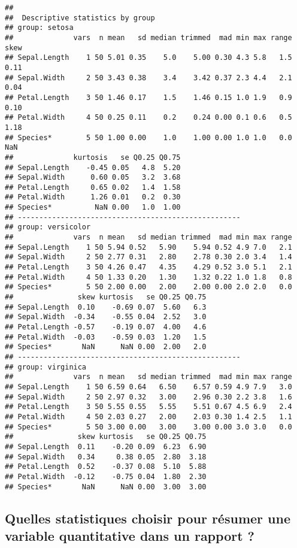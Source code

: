 \documentclass[
  french,
]{book}
\begin{document}
\begin{verbatim}
## 
##  Descriptive statistics by group 
## group: setosa
##              vars  n mean   sd median trimmed  mad min max range skew
## Sepal.Length    1 50 5.01 0.35    5.0    5.00 0.30 4.3 5.8   1.5 0.11
## Sepal.Width     2 50 3.43 0.38    3.4    3.42 0.37 2.3 4.4   2.1 0.04
## Petal.Length    3 50 1.46 0.17    1.5    1.46 0.15 1.0 1.9   0.9 0.10
## Petal.Width     4 50 0.25 0.11    0.2    0.24 0.00 0.1 0.6   0.5 1.18
## Species*        5 50 1.00 0.00    1.0    1.00 0.00 1.0 1.0   0.0  NaN
##              kurtosis   se Q0.25 Q0.75
## Sepal.Length    -0.45 0.05   4.8  5.20
## Sepal.Width      0.60 0.05   3.2  3.68
## Petal.Length     0.65 0.02   1.4  1.58
## Petal.Width      1.26 0.01   0.2  0.30
## Species*          NaN 0.00   1.0  1.00
## ---------------------------------------------------- 
## group: versicolor
##              vars  n mean   sd median trimmed  mad min max range
## Sepal.Length    1 50 5.94 0.52   5.90    5.94 0.52 4.9 7.0   2.1
## Sepal.Width     2 50 2.77 0.31   2.80    2.78 0.30 2.0 3.4   1.4
## Petal.Length    3 50 4.26 0.47   4.35    4.29 0.52 3.0 5.1   2.1
## Petal.Width     4 50 1.33 0.20   1.30    1.32 0.22 1.0 1.8   0.8
## Species*        5 50 2.00 0.00   2.00    2.00 0.00 2.0 2.0   0.0
##               skew kurtosis   se Q0.25 Q0.75
## Sepal.Length  0.10    -0.69 0.07  5.60   6.3
## Sepal.Width  -0.34    -0.55 0.04  2.52   3.0
## Petal.Length -0.57    -0.19 0.07  4.00   4.6
## Petal.Width  -0.03    -0.59 0.03  1.20   1.5
## Species*       NaN      NaN 0.00  2.00   2.0
## ---------------------------------------------------- 
## group: virginica
##              vars  n mean   sd median trimmed  mad min max range
## Sepal.Length    1 50 6.59 0.64   6.50    6.57 0.59 4.9 7.9   3.0
## Sepal.Width     2 50 2.97 0.32   3.00    2.96 0.30 2.2 3.8   1.6
## Petal.Length    3 50 5.55 0.55   5.55    5.51 0.67 4.5 6.9   2.4
## Petal.Width     4 50 2.03 0.27   2.00    2.03 0.30 1.4 2.5   1.1
## Species*        5 50 3.00 0.00   3.00    3.00 0.00 3.0 3.0   0.0
##               skew kurtosis   se Q0.25 Q0.75
## Sepal.Length  0.11    -0.20 0.09  6.23  6.90
## Sepal.Width   0.34     0.38 0.05  2.80  3.18
## Petal.Length  0.52    -0.37 0.08  5.10  5.88
## Petal.Width  -0.12    -0.75 0.04  1.80  2.30
## Species*       NaN      NaN 0.00  3.00  3.00
\end{verbatim}

\hypertarget{quelles-statistiques-choisir-pour-ruxe9sumer-une-variable-quantitative-dans-un-rapport}{%
\subsection{Quelles statistiques choisir pour résumer une variable quantitative dans un rapport ?}\label{quelles-statistiques-choisir-pour-ruxe9sumer-une-variable-quantitative-dans-un-rapport}}
\end{document}
